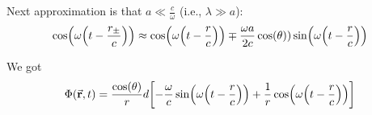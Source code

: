 Next approximation is that $a\ll \frac{c}{\omega}$ (i.e., $\lambda \gg a$):
$$\cos(\omega\qty(t-\frac{r_\pm}{c})) \approx \cos(\omega\qty(t-\frac{r}{c})) \mp \frac{\omega a}{2c} \cos(\theta)) \sin(\omega\qty(t-\frac{r}{c}))$$

We got
$$\Phi(\va{r},t) = \frac{\cos(\theta)}{r}d\qty[-\frac{\omega}{c} \sin(\omega\qty(t-\frac{r}{c})) +\frac{1}{r}\cos(\omega\qty(t-\frac{r}{c}))]$$